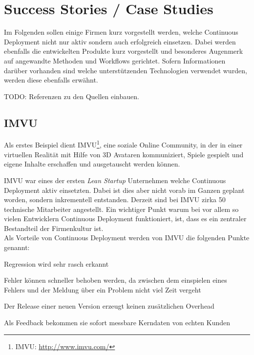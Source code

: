 \section{Success Stories / Case Studies}
\label{sec:success-stories}

Im Folgenden sollen einige Firmen kurz vorgestellt werden, welche Continuous
Deployment nicht nur aktiv sondern auch erfolgreich einsetzen. Dabei werden
ebenfalls die entwickelten Produkte kurz vorgestellt und besonderes Augenmerk
auf angewandte Methoden und Workflows gerichtet. Sofern Informationen darüber
vorhanden sind welche unterstützenden Technologien verwendet wurden, werden
diese ebenfalls erwähnt.

\begin{wichtigbox}
TODO: Referenzen zu den Quellen einbauen.
\end{wichtigbox}

\subsection{IMVU}
\label{subsec:imvu}

Als erstes Beispiel dient IMVU\footnote{IMVU: \url{http://www.imvu.com/}},
eine soziale Online Community, in der in einer virtuellen Realität mit Hilfe
von 3D Avataren kommuniziert, Spiele gespielt und eigene Inhalte erschaffen
und ausgetauscht werden können.

IMVU war eines der ersten \emph{Lean Startup} Unternehmen welche Continuous
Deployment aktiv einsetzten. Dabei ist dies aber nicht vorab im Ganzen geplant
worden, sondern inkrementell entstanden. Derzeit sind bei IMVU zirka 50
technische Mitarbeiter angestellt. Ein wichtiger Punkt warum bei vor allem so
vielen Entwicklern Continuous Deployment funktioniert, ist, dass es ein
zentraler Bestandteil der Firmenkultur ist. \\
Als Vorteile von Continuous Deployment werden von IMVU die folgenden Punkte
genannt:

\begin{itemize*}
    \item Regression wird sehr rasch erkannt
    \item Fehler können schneller behoben werden, da zwischen dem einspielen
          eines Fehlers und der Meldung über ein Problem nicht viel Zeit vergeht
    \item Der Release einer neuen Version erzeugt keinen zusätzlichen Overhead
    \item Als Feedback bekommen sie sofort messbare Kerndaten von echten Kunden
\end{itemize*}


